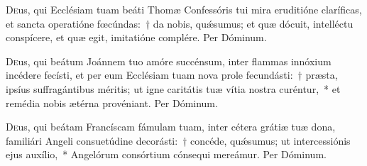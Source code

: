 \documentclass[vesperale_romanum.tex]{subfiles}
\begin{document}

\duplex

\odoctoroptime

\oratio

\lettrine{D}{e}us, qui Ecclésiam tuam beáti Thomæ Confessóris tui mira eruditióne claríficas, et san\-cta operatióne fœcúndas:~† da nobis, quǽsumus; et quæ dócuit, intellé\-ctu conspícere, et quæ egit, imitatióne complére. Per Dóminum.


\capitdeseqquad

\myrule


\duplex

\oratio

\lettrine{D}{e}us, qui beátum Joánnem tuo amóre succénsum, inter flammas innóxium incédere fecísti, et per eum Ecclésiam tuam nova prole fecundásti:~† præsta, i\-psíus suffragántibus méritis; ut igne caritátis tuæ vítia nostra curéntur,~* et remédia nobis ætérna provéniant. Per Dóminum.


\myrule

\newpage


\duplex

\oratio

\lettrine{D}{e}us, qui beátam Francíscam fámulam tuam, inter cétera grátiæ tuæ dona, familiári Angeli consuetúdine decorásti:~† concéde, quǽsumus; ut intercessiónis ejus auxílio,~* Angelórum consórtium cónsequi mereámur.
Per Dóminum.


\end{document}
